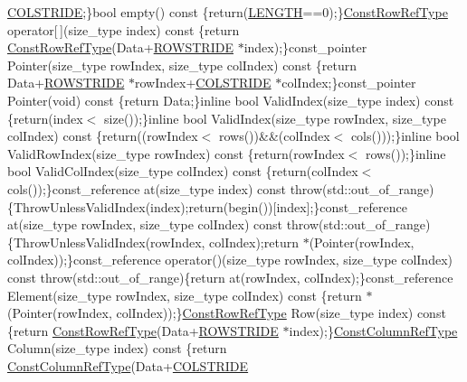 \begin{DoxyCompactItemize}
\hyperlink{classvct_fixed_size_const_matrix_base_a0aa9b864b8810dd6a50640c965564bd0aee4513ad3dee685fdda1bc2c264be993}{C\+O\+L\+S\+T\+R\+I\+D\+E};\}bool empty() const \{return(\hyperlink{classvct_fixed_size_const_matrix_base_a05da4a844e1880e31d3052abb9a8063ba3a9b8b3d119455a4b5f4a6553a707f92}{L\+E\+N\+G\+T\+H}==0);\}\hyperlink{classvct_fixed_size_const_matrix_base_a74355396eec7437755398c2810e0df41}{Const\+Row\+Ref\+Type} operator\mbox{[}$\,$\mbox{]}(size\+\_\+type index) const \{return \hyperlink{classvct_fixed_size_const_matrix_base_a74355396eec7437755398c2810e0df41}{Const\+Row\+Ref\+Type}(Data+\hyperlink{classvct_fixed_size_const_matrix_base_a0aa9b864b8810dd6a50640c965564bd0a1249f054e777d0972eee94e9e33c3f4f}{R\+O\+W\+S\+T\+R\+I\+D\+E} $\ast$index);\}const\+\_\+pointer Pointer(size\+\_\+type row\+Index, size\+\_\+type col\+Index) const \{return Data+\hyperlink{classvct_fixed_size_const_matrix_base_a0aa9b864b8810dd6a50640c965564bd0a1249f054e777d0972eee94e9e33c3f4f}{R\+O\+W\+S\+T\+R\+I\+D\+E} $\ast$row\+Index+\hyperlink{classvct_fixed_size_const_matrix_base_a0aa9b864b8810dd6a50640c965564bd0aee4513ad3dee685fdda1bc2c264be993}{C\+O\+L\+S\+T\+R\+I\+D\+E} $\ast$col\+Index;\}const\+\_\+pointer Pointer(void) const \{return Data;\}inline bool Valid\+Index(size\+\_\+type index) const \{return(index$<$ size());\}inline bool Valid\+Index(size\+\_\+type row\+Index, size\+\_\+type col\+Index) const \{return((row\+Index$<$ rows())\&\&(col\+Index$<$ cols()));\}inline bool Valid\+Row\+Index(size\+\_\+type row\+Index) const \{return(row\+Index$<$ rows());\}inline bool Valid\+Col\+Index(size\+\_\+type col\+Index) const \{return(col\+Index$<$ cols());\}const\+\_\+reference at(size\+\_\+type index) const throw(std\+::out\+\_\+of\+\_\+range)\{Throw\+Unless\+Valid\+Index(index);return(begin())\mbox{[}index\mbox{]};\}const\+\_\+reference at(size\+\_\+type row\+Index, size\+\_\+type col\+Index) const throw(std\+::out\+\_\+of\+\_\+range)\{Throw\+Unless\+Valid\+Index(row\+Index, col\+Index);return $\ast$(Pointer(row\+Index, col\+Index));\}const\+\_\+reference operator()(size\+\_\+type row\+Index, size\+\_\+type col\+Index) const throw(std\+::out\+\_\+of\+\_\+range)\{return at(row\+Index, col\+Index);\}const\+\_\+reference Element(size\+\_\+type row\+Index, size\+\_\+type col\+Index) const \{return $\ast$(Pointer(row\+Index, col\+Index));\}\hyperlink{classvct_fixed_size_const_matrix_base_a74355396eec7437755398c2810e0df41}{Const\+Row\+Ref\+Type} Row(size\+\_\+type index) const \{return \hyperlink{classvct_fixed_size_const_matrix_base_a74355396eec7437755398c2810e0df41}{Const\+Row\+Ref\+Type}(Data+\hyperlink{classvct_fixed_size_const_matrix_base_a0aa9b864b8810dd6a50640c965564bd0a1249f054e777d0972eee94e9e33c3f4f}{R\+O\+W\+S\+T\+R\+I\+D\+E} $\ast$index);\}\hyperlink{classvct_fixed_size_const_matrix_base_a68ed47f84a2855832fa0c18fafda6843}{Const\+Column\+Ref\+Type} Column(size\+\_\+type index) const \{return \hyperlink{classvct_fixed_size_const_matrix_base_a68ed47f84a2855832fa0c18fafda6843}{Const\+Column\+Ref\+Type}(Data+\hyperlink{classvct_fixed_size_const_matrix_base_a0aa9b864b8810dd6a50640c965564bd0aee4513ad3dee685fdda1bc2c264be993}{C\+O\+L\+S\+T\+R\+I\+D\+E} 
\end{DoxyCompactItemize}

